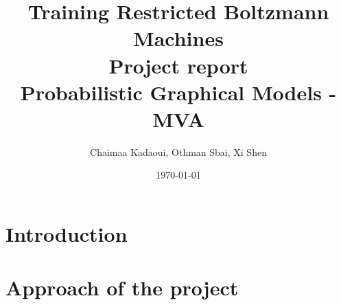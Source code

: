 \documentclass[a4paper,10pt]{article}
\title{%
	\huge{Training Restricted Boltzmann Machines}\\ \bigbreak
  	\Large{Project report}\\ 
  	\Large{Probabilistic Graphical Models - MVA}
}
\author{Chaimaa Kadaoui, Othman Sbai, Xi Shen}
\date\today
\begin{document}
\maketitle

\section{Introduction}



\section{Approach of the project}


\cite{redmon_you_2015}






\end{document}
